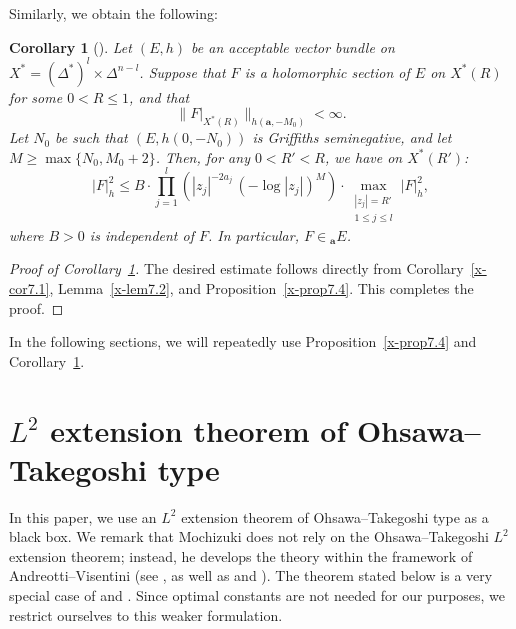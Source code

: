 \documentclass[12pt,twoside]{amsart}
\newtheorem{cor}[thm]{Corollary}
\theoremstyle{definition}
\begin{document}
Similarly, we obtain the following:

\begin{cor}[{\cite[Corollary~21.2.9]{mochizuki4}}]\label{x-cor7.5}
Let $(E,h)$ be an acceptable vector bundle on $X^*=(\Delta^*)^l
\times \Delta^{n-l}$.  
Suppose that $F$ is a holomorphic section of $E$ on $X^*(R)$ 
for some $0 < R \le 1$, and that
\[
\| F|_{X^*(R)} \|_{h(\bm{a},-M_0)} < \infty.
\]
Let $N_0$ be such that $(E,h(0,-N_0))$ is Griffiths seminegative, 
and let $M \ge \max\{ N_0, M_0 + 2 \}$.  
Then, for any $0 < R' < R$, we have on $X^*(R')$:
\[
|F|_h^2 
\le 
B \cdot 
\prod_{j=1}^l \left( |z_j|^{-2a_j} \, (-\log |z_j|)^M \right)
\cdot 
\max_{\substack{|z_j| = R' \\ 1 \le j \le l}} |F|_h^2,
\]
where $B > 0$ is independent of $F$.  
In particular, $F \in {}_{\bm{a}} E$.
\end{cor}

\begin{proof}[Proof of Corollary~\ref{x-cor7.5}]
The desired estimate follows directly from 
Corollary~\ref{x-cor7.1}, Lemma~\ref{x-lem7.2}, 
and Proposition~\ref{x-prop7.4}.  
This completes the proof.
\end{proof}

In the following sections, we will repeatedly use 
Proposition~\ref{x-prop7.4} and Corollary~\ref{x-cor7.5}.

\section{$L^2$ extension theorem of Ohsawa--Takegoshi type}\label{x-sec8}

In this paper, we use an $L^2$ extension theorem of
Ohsawa--Takegoshi type as a black box. 
We remark that Mochizuki does not rely on the
Ohsawa--Takegoshi $L^2$ extension theorem; instead,
he develops the theory within the framework of
Andreotti--Visentini
(see \cite[21.1.~Some general results on vector bundles on
K\"ahler manifolds]{mochizuki4},
as well as \cite{av} and \cite{cornalba-griffiths}). 
The theorem stated below is a very special case of
\cite[Theorem]{ohsawa} and
\cite[Corollary~3.13]{guan-zhou}.
Since optimal constants are not needed for our purposes,
we restrict ourselves to this weaker formulation.
\end{document}
